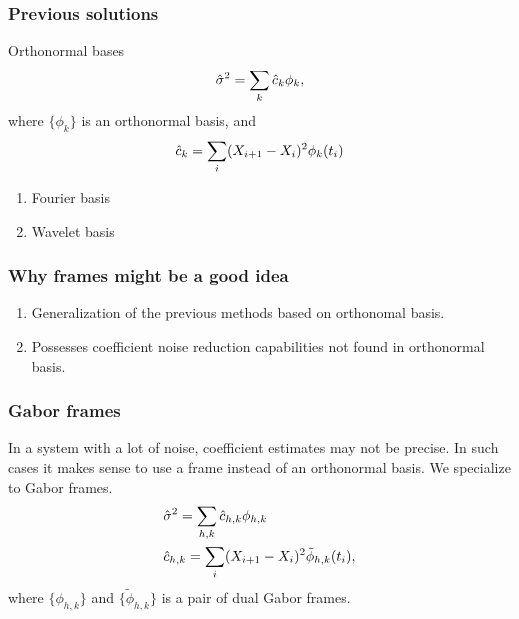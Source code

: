 \documentclass[fleqn]{beamer}
\begin{document}
\begin{frame}
  \frametitle{Previous solutions}
  Orthonormal bases
        \begin{align}
          \hat{\sigma}^2 = \sum_{k} \hat{c}_k \phi_k \notag,
        \label{}
      \end{align}
   where $\{\phi_k\}$ is an orthonormal basis, and 
   \begin{align}
     \hat{c}_k = \sum_i (X_{i+1} - X_i)^2 \phi_k(t_i) \notag
     \label{}
   \end{align}
   \begin{enumerate}
    \item Fourier basis
    \item Wavelet basis
  \end{enumerate}
\end{frame}
\begin{frame}
  \frametitle{Why frames might be a good idea}
  \begin{enumerate}
    \item Generalization of the previous methods based on orthonomal basis.
    \item Possesses coefficient noise reduction capabilities not found in orthonormal basis.  
  \end{enumerate}
\end{frame}
\begin{frame}
  \frametitle{Gabor frames}
  In a system with a lot of noise, coefficient estimates may not be precise. In such cases it makes sense to use a frame instead of an orthonormal basis. We specialize to Gabor frames.
  \begin{align}
    &\hat{\sigma}^2 = \sum_{h,k} \hat{c}_{h,k} \phi_{h,k} \notag\\
    &\hat{c}_{h,k} = \sum_i (X_{i+1} - X_i)^2 \tilde{\phi}_{h,k}(t_i), \notag
    \label{}
  \end{align}
  where $\{\phi_{h,k}\}$ and $\{\tilde{\phi}_{h,k}\}$ is a pair of dual Gabor frames.
\end{frame}
\end{document}
